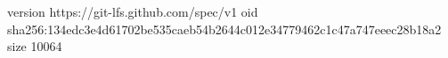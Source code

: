 version https://git-lfs.github.com/spec/v1
oid sha256:134edc3e4d61702be535caeb54b2644c012e34779462c1c47a747eeec28b18a2
size 10064
